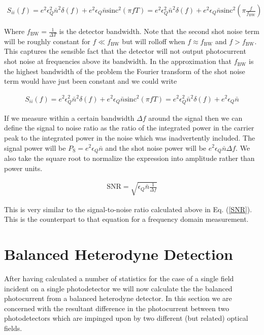 \documentclass[12pt]{article}
\newcommand{\ep}{\epsilon}
\newcommand{\sinc}{\text{sinc}}
\begin{document}
\begin{align}
S_{ii}(f) = e^2 \ep_Q^2 \bar{n}^2 \delta(f) + e^2 \ep_Q \bar{n} \sinc^2(\pi f T) = e^2 \ep_Q^2 \bar{n}^2 \delta(f) + e^2 \ep_Q \bar{n} \sinc^2\left(\pi \frac{f}{f_{\text{BW}}}\right)
\end{align}

Where $f_{\text{BW}} = \frac{1}{\Delta T}$ is the detector bandwidth. Note that the second shot noise term will be roughly constant for $f \ll f_{\text{BW}}$ but will rolloff when $f \approx f_{\text{BW}}$ and $f>f_{\text{BW}}$. This captures the sensible fact that the detector will not output photocurrent shot noise at frequencies above its bandwidth. In the approximation that $f_{\text{BW}}$ is the highest bandwidth of the problem the Fourier transform of the shot noise term would have just been constant and we could write

\begin{align}
S_{ii}(f) = e^2 \ep_Q^2 \bar{n}^2 \delta(f) + e^2 \ep_Q \bar{n} \sinc^2(\pi f T) = e^2 \ep_Q^2 \bar{n}^2 \delta(f) + e^2 \ep_Q \bar{n}
\end{align}

If we measure within a certain bandwidth $\Delta f$ around the signal then we can define the signal to noise ratio as the ratio of the  integrated power in the carrier peak to the integrated power in the noise which was inadvertently included. The signal power will be $P_{\text{S}} = e^2 \ep_Q \bar{n}$ and the shot noise power will be $e^2 \ep_Q \bar{n} \Delta f$. We also take the square root to normalize the expression into amplitude rather than power units.

\begin{align}
\text{SNR} = \sqrt{\ep_Q \bar{n} \frac{1}{\Delta f}}
\end{align}

This is very similar to the signal-to-noise ratio calculated above in Eq. (\ref{SNR}). This is the counterpart to that equation for a frequency domain measurement.

\section{Balanced Heterodyne Detection}

After having calculated a number of statistics for the case of a single field incident on a single photodetector we will now calculate the the balanced photocurrent from a balanced heterodyne detector. In this section we are concerned with the resultant difference in the photocurrent between two photodetectors which are impinged upon by two different (but related) optical fields.
\end{document}

